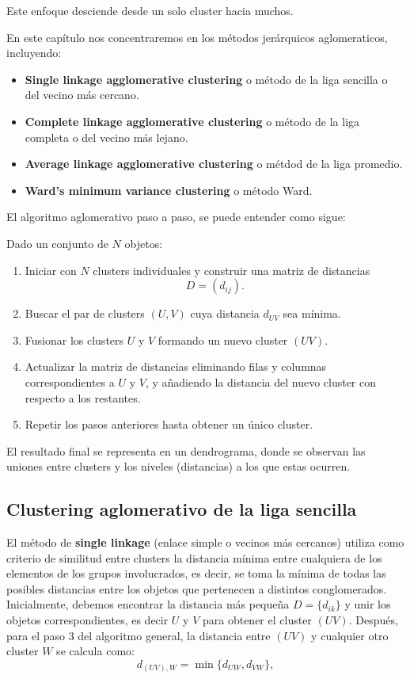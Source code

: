 \documentclass[
]{book}
\providecommand{\tightlist}{%
  \setlength{\itemsep}{0pt}\setlength{\parskip}{0pt}}
\begin{document}
Este enfoque desciende desde un solo cluster hacia muchos.

En este capítulo nos concentraremos en los métodos jerárquicos aglomeraticos, incluyendo:

\begin{itemize}
\tightlist
\item
  \textbf{Single linkage agglomerative clustering} o método de la liga sencilla o del vecino más cercano.
\item
  \textbf{Complete linkage agglomerative clustering} o método de la liga completa o del vecino más lejano.
\item
  \textbf{Average linkage agglomerative clustering} o métdod de la liga promedio.
\item
  \textbf{Ward's minimum variance clustering} o método Ward.
\end{itemize}

El algoritmo aglomerativo paso a paso, se puede entender como sigue:

Dado un conjunto de \(N\) objetos:

\begin{enumerate}
\def\labelenumi{\arabic{enumi})}
\item
  Iniciar con \(N\) clusters individuales y construir una matriz de distancias
  \[
   D = (d_{ij}).
   \]
\item
  Buscar el par de clusters \((U,V)\) cuya distancia \(d_{UV}\) sea mínima.
\item
  Fusionar los clusters \(U\) y \(V\) formando un nuevo cluster \((UV)\).
\item
  Actualizar la matriz de distancias eliminando filas y columnas correspondientes a \(U\) y \(V\), y añadiendo la distancia del nuevo cluster con respecto a los restantes.
\item
  Repetir los pasos anteriores hasta obtener un único cluster.
\end{enumerate}

El resultado final se representa en un dendrograma, donde se observan las uniones entre clusters y los niveles (distancias) a los que estas ocurren.

\subsection{Clustering aglomerativo de la liga sencilla}\label{clustering-aglomerativo-de-la-liga-sencilla}

El método de \textbf{single linkage} (enlace simple o vecinos más cercanos) utiliza como criterio de similitud entre clusters la distancia mínima entre cualquiera de los elementos de los grupos involucrados, es decir, se toma la mínima de todas las posibles distancias entre los objetos que pertenecen a distintos conglomerados. Inicialmente, debemos encontrar la distancia más pequeña \(D = \{d_{ik}\}\) y unir los objetos correspondientes, es decir \(U\) y \(V\) para obtener el cluster \((UV)\). Después, para el paso 3 del algoritmo general, la distancia entre \((UV)\) y cualquier otro cluster \(W\) se calcula como:
\[
d_{(UV),W} = \min\{d_{UW},d_{VW}\},
\]
\end{document}
